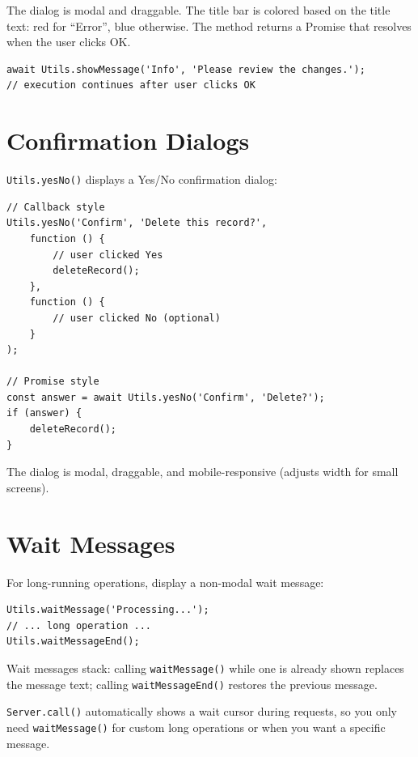 \noindent
The dialog is modal and draggable.  The title bar is colored based on the title text: red for ``Error'', blue otherwise.  The method returns a Promise that resolves when the user clicks OK.

\begin{lstlisting}[style=javascript]
await Utils.showMessage('Info', 'Please review the changes.');
// execution continues after user clicks OK
\end{lstlisting}

\section{Confirmation Dialogs}
\label{sec:popup-yesno}

\texttt{Utils.yesNo()} displays a Yes/No confirmation dialog:

\begin{lstlisting}[style=javascript]
// Callback style
Utils.yesNo('Confirm', 'Delete this record?',
    function () {
        // user clicked Yes
        deleteRecord();
    },
    function () {
        // user clicked No (optional)
    }
);

// Promise style
const answer = await Utils.yesNo('Confirm', 'Delete?');
if (answer) {
    deleteRecord();
}
\end{lstlisting}

\noindent
The dialog is modal, draggable, and mobile-responsive (adjusts width for small screens).

\section{Wait Messages}
\label{sec:popup-wait}

For long-running operations, display a non-modal wait message:

\begin{lstlisting}[style=javascript]
Utils.waitMessage('Processing...');
// ... long operation ...
Utils.waitMessageEnd();
\end{lstlisting}

\noindent
Wait messages stack: calling \texttt{waitMessage()} while one is already shown replaces the message text; calling \texttt{waitMessageEnd()} restores the previous message.

\begin{notebox}
\texttt{Server.call()} automatically shows a wait cursor during requests, so you only need \texttt{waitMessage()} for custom long operations or when you want a specific message.
\end{notebox}

